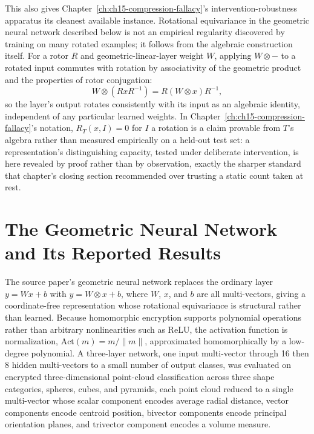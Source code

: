 This also gives Chapter~\ref{ch:ch15-compression-fallacy}'s intervention-robustness apparatus its cleanest available instance. Rotational equivariance in the geometric neural network described below is not an empirical regularity discovered by training on many rotated examples; it follows from the algebraic construction itself. For a rotor $R$ and geometric-linear-layer weight $W$, applying $W \otimes -$ to a rotated input commutes with rotation by associativity of the geometric product and the properties of rotor conjugation:
\[
W \otimes (RxR^{-1}) = R(W \otimes x)R^{-1},
\]
so the layer's output rotates consistently with its input as an algebraic identity, independent of any particular learned weights. In Chapter~\ref{ch:ch15-compression-fallacy}'s notation, $R_T(x,I) = 0$ for $I$ a rotation is a claim provable from $T$'s algebra rather than measured empirically on a held-out test set: a representation's distinguishing capacity, tested under deliberate intervention, is here revealed by proof rather than by observation, exactly the sharper standard that chapter's closing section recommended over trusting a static count taken at rest.

\section{The Geometric Neural Network and Its Reported Results}

The source paper's geometric neural network replaces the ordinary layer $y = Wx + b$ with $y = W \otimes x + b$, where $W$, $x$, and $b$ are all multi-vectors, giving a coordinate-free representation whose rotational equivariance is structural rather than learned. Because homomorphic encryption supports polynomial operations rather than arbitrary nonlinearities such as ReLU, the activation function is normalization, $\mathrm{Act}(m) = m/\|m\|$, approximated homomorphically by a low-degree polynomial. A three-layer network, one input multi-vector through 16 then 8 hidden multi-vectors to a small number of output classes, was evaluated on encrypted three-dimensional point-cloud classification across three shape categories, spheres, cubes, and pyramids, each point cloud reduced to a single multi-vector whose scalar component encodes average radial distance, vector components encode centroid position, bivector components encode principal orientation planes, and trivector component encodes a volume measure.

